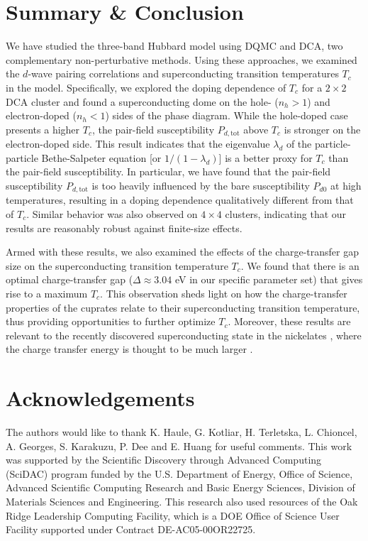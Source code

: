 \documentclass[reprint,nofootinbib,nobibnotes,amsmath,amssymb,aps,prb,floatfix]{revtex4-1}
\begin{document}
\section{Summary  \& Conclusion}
We have studied the three-band Hubbard model using DQMC and DCA, two complementary non-perturbative methods. Using these approaches, we examined the $d$-wave pairing correlations and superconducting transition temperatures $T_c$ in the model.  
Specifically, we explored the doping dependence of $T_c$ for a $2\times2$ DCA cluster and found a superconducting dome on the hole- ($n_h>1$) and electron-doped ($n_h<1$) sides of the phase diagram. While the hole-doped case presents a higher $T_c$, the pair-field susceptibility $P_{d,\text{tot}}$ above $T_c$ is stronger on the electron-doped side. This result indicates that the  eigenvalue $\lambda_d$ of the particle-particle Bethe-Salpeter equation [or $1/(1-\lambda_d)$] is a better proxy for $T_c$ than the pair-field susceptibility. In particular, we have found that the pair-field susceptibility $P_{d,\text{tot}}$ is too heavily influenced by the bare susceptibility $P_{d0}$ at high temperatures, resulting in a doping dependence qualitatively different from that of $T_c$. Similar behavior was also observed on $4\times4$ clusters, indicating that our results are reasonably robust against finite-size effects.   

Armed with these results, we also examined the effects of the charge-transfer gap size on the superconducting transition temperature $T_c$. We found that there is an optimal charge-transfer gap ($\Delta\approx3.04$ eV in our specific parameter set) that gives rise to a maximum $T_c$. This observation sheds light on how the charge-transfer properties of the cuprates relate to their superconducting transition temperature, thus providing opportunities to further optimize $T_c$.  Moreover, these results are  relevant to the recently discovered superconducting state in the nickelates \cite{Li}, where the charge transfer energy is thought to be much larger \cite{Li, Jiang}. 

\section{Acknowledgements} The authors would like to thank K. Haule, G. Kotliar, H. Terletska, L. Chioncel, A. Georges, S. Karakuzu, P. Dee and E. Huang for useful comments. This work was supported by the Scientific Discovery through Advanced Computing (SciDAC) program funded by the U.S. Department of Energy, Office of Science, Advanced Scientific Computing Research and Basic Energy Sciences, Division of Materials Sciences and Engineering. This research also used resources of the Oak Ridge Leadership Computing Facility, which is a DOE Office of Science User Facility supported under Contract DE-AC05-00OR22725.
\end{document}
